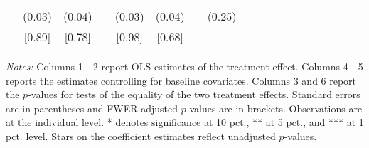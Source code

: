\begin{table}[htbp]
{\begin{threeparttable}
\begin{tabular}{l*{8}{c}}
          &   (0.03)&   (0.04)&         &   (0.03)&   (0.04)&         &   (0.25)&         \\
          &   [0.89]&   [0.78]&         &   [0.98]&   [0.68]&         &         &         \\
\bottomrule \end{tabular} \begin{tablenotes}[flushleft] \footnotesize \item \emph{Notes:} Columns 1 - 2 report OLS estimates of the treatment effect. Columns 4 - 5 reports the estimates controlling for baseline covariates. Columns 3 and 6 report the \(p\)-values for tests of the equality of the two treatment effects. Standard errors are in parentheses and FWER adjusted \(p\)-values are in brackets. Observations are at the individual level. * denotes significance at 10 pct., ** at 5 pct., and *** at 1 pct. level. Stars on the coefficient estimates reflect unadjusted \(p\)-values. \end{tablenotes} \end{threeparttable} } \end{table}

